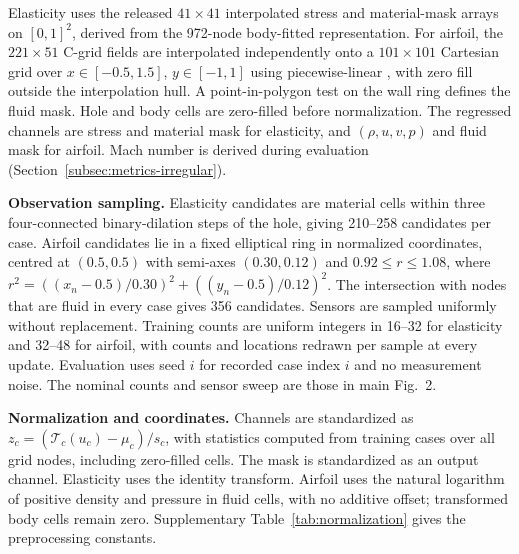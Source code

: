 \documentclass[11pt]{article}
\newcommand{\detail}[1]{\par\Needspace{4\baselineskip}\textbf{#1}\enspace}
\newcommand{\code}[1]{\texttt{\detokenize{#1}}}
\begin{document}
Elasticity uses the released $41\times41$ interpolated stress and material-mask arrays on $[0,1]^2$, derived from the 972-node body-fitted representation. For airfoil, the $221\times51$ C-grid fields are interpolated independently onto a $101\times101$ Cartesian grid over $x\in[-0.5,1.5]$, $y\in[-1,1]$ using piecewise-linear \code{scipy.interpolate.griddata}, with zero fill outside the interpolation hull. A point-in-polygon test on the wall ring defines the fluid mask. Hole and body cells are zero-filled before normalization. The regressed channels are stress and material mask for elasticity, and $(\rho,u,v,p)$ and fluid mask for airfoil. Mach number is derived during evaluation (Section~\ref{subsec:metrics-irregular}).

\detail{Observation sampling.} Elasticity candidates are material cells within three four-connected binary-dilation steps of the hole, giving 210--258 candidates per case. Airfoil candidates lie in a fixed elliptical ring in normalized coordinates, centred at $(0.5,0.5)$ with semi-axes $(0.30,0.12)$ and $0.92\le r\le1.08$, where $r^2=((x_n-0.5)/0.30)^2+((y_n-0.5)/0.12)^2$. The intersection with nodes that are fluid in every case gives 356 candidates. Sensors are sampled uniformly without replacement. Training counts are uniform integers in 16--32 for elasticity and 32--48 for airfoil, with counts and locations redrawn per sample at every update. Evaluation uses seed $i$ for recorded case index $i$ and no measurement noise. The nominal counts and sensor sweep are those in main Fig.~2.

\detail{Normalization and coordinates.} Channels are standardized as $z_c=(\mathcal T_c(u_c)-\mu_c)/s_c$, with statistics computed from training cases over all grid nodes, including zero-filled cells. The mask is standardized as an output channel. Elasticity uses the identity transform. Airfoil uses the natural logarithm of positive density and pressure in fluid cells, with no additive offset; transformed body cells remain zero. Supplementary Table~\ref{tab:normalization} gives the preprocessing constants.
\end{document}
